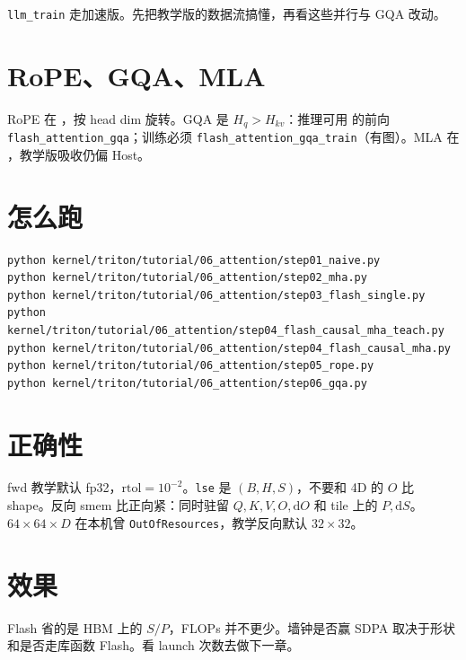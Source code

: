 
\figgqa

\texttt{llm\_train} 走加速版。先把教学版的数据流搞懂，再看这些并行与 GQA 改动。

\section{RoPE、GQA、MLA}

RoPE 在 ，按 head dim 旋转。GQA 是 $H_q>H_{kv}$：推理可用  的前向 \texttt{flash\_attention\_gqa}；训练必须 \texttt{flash\_attention\_gqa\_train}（有图）。MLA 在 ，教学版吸收仍偏 Host。

\section{怎么跑}

\begin{runcmd}
\begin{lstlisting}[style=shell]
python kernel/triton/tutorial/06_attention/step01_naive.py
python kernel/triton/tutorial/06_attention/step02_mha.py
python kernel/triton/tutorial/06_attention/step03_flash_single.py
python kernel/triton/tutorial/06_attention/step04_flash_causal_mha_teach.py
python kernel/triton/tutorial/06_attention/step04_flash_causal_mha.py
python kernel/triton/tutorial/06_attention/step05_rope.py
python kernel/triton/tutorial/06_attention/step06_gqa.py
\end{lstlisting}
\end{runcmd}

\section{正确性}

\begin{note}
fwd 教学默认 fp32，$\mathrm{rtol}=10^{-2}$。\texttt{lse} 是 $(B,H,S)$，不要和 4D 的 $O$ 比 shape。反向 smem 比正向紧：同时驻留 $Q,K,V,O,\mathrm{d}O$ 和 tile 上的 $P,\mathrm{d}S$。$64\times 64\times D$ 在本机曾 \texttt{OutOfResources}，教学反向默认 $32\times 32$。
\end{note}

\section{效果}

\begin{remark}
Flash 省的是 HBM 上的 $S/P$，FLOPs 并不更少。墙钟是否赢 SDPA 取决于形状和是否走库函数 Flash。看 launch 次数去做下一章。
\end{remark}
